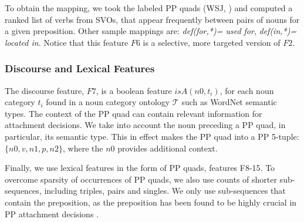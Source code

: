 To obtain the mapping, we took the labeled PP quads (WSJ, \cite{Ratnaparkhi1994}) and computed a ranked list of verbs from SVOs, that appear frequently between  pairs of nouns  for a given preposition.
 Other   sample mappings are:  \textit{def(for,*)= used for},   \textit{def(in,*)= located in}. Notice that this feature $F6$ is a selective, more targeted version of $F2$.




\subsubsection{Discourse and Lexical Features}
The  discourse feature, $F7$,  is  a boolean feature  $isA(n0,t_i)$, for each noun category $t_i$ found in a noun category ontology  $\mathcal{T}$  such as WordNet semantic types. 
The context of the PP quad can contain relevant information  for  attachment decisions. We  take into account the noun preceding  a PP quad, in particular, its semantic type. This in effect makes the PP quad into a  PP 5-tuple:  $\{n0, v, n1, p, n2\}$, where the $n0$  provides additional context.

Finally, we  use  lexical features in the form of PP quads, features F8-15.  To overcome sparsity of  occurrences of PP quads, we also use counts of shorter sub-sequences, including  triples, pairs and singles. We only use sub-sequences that contain the preposition, as the preposition has been found to be highly crucial in PP attachment decisions \cite{Collins95}.
   
